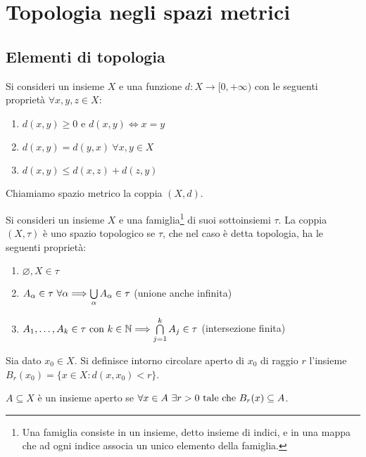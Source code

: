 \chapter{Topologia negli spazi metrici}

\section{Elementi di topologia}

\begin{definition}
    Si consideri un insieme $X$ e una funzione $d: X \to [0, +\infty)$ con le seguenti proprietà $\forall x,y,z \in X$:
    \begin{enumerate}
        \item $d(x,y) \geq 0$ e $d(x,y) \iff  x = y$
        \item $d(x,y) = d(y,x) \  \forall x, y \in X$
        \item $d(x,y) \leq d(x,z) + d(z,y)$
    \end{enumerate}
    Chiamiamo spazio metrico la coppia $(X, d)$.
\end{definition}

\begin{definition}[Topologia]
    Si consideri un insieme $X$ e una famiglia\footnote{Una famiglia consiste in un insieme, detto insieme di indici, e in una mappa che ad ogni indice associa un unico elemento della famiglia.} di suoi sottoinsiemi $\tau$. La coppia $(X, \tau)$ è uno spazio topologico se $\tau$, che nel caso è detta topologia, ha le seguenti proprietà:
    \begin{enumerate}
        \item $\varnothing, X \in \tau$
        \item $A_{\alpha} \in \tau \ \forall \alpha \Longrightarrow \bigcup\limits_\alpha A_\alpha \in \tau$ (unione anche infinita)
        \item $A_1,\dots,A_k \in \tau \text{ con } k \in \mathbb{N} \Longrightarrow \bigcap\limits_{j=1}^k A_j \in \tau$ (intersezione finita)
    \end{enumerate}
\end{definition}

\begin{definition}
    Sia dato $x_0 \in X$. Si definisce intorno circolare aperto di $x_0$ di raggio $r$ l'insieme $B_r(x_0)=\{x \in X : d(x, x_0) < r\}$.
\end{definition}

\begin{definition}
    $A \subseteq X$ è un insieme aperto se $\forall x \in A \ \exists r>0 \tc B_r(x) \subseteq A$.
\end{definition}

